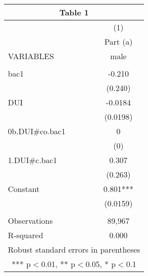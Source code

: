\documentclass[]{article}
\begin{document}
\begin{tabular}{lc}
\multicolumn{2}{c}{Table 1} \\ \hline
 & (1) \\
 & Part (a) \\
VARIABLES & male \\ \hline
 &  \\
bac1 & -0.210 \\
 & (0.240) \\
DUI & -0.0184 \\
 & (0.0198) \\
0b.DUI\#co.bac1 & 0 \\
 & (0) \\
1.DUI\#c.bac1 & 0.307 \\
 & (0.263) \\
Constant & 0.801*** \\
 & (0.0159) \\
 &  \\
Observations & 89,967 \\
 R-squared & 0.000 \\ \hline
\multicolumn{2}{c}{ Robust standard errors in parentheses} \\
\multicolumn{2}{c}{ *** p$<$0.01, ** p$<$0.05, * p$<$0.1} \\
\end{tabular}
\end{document}
